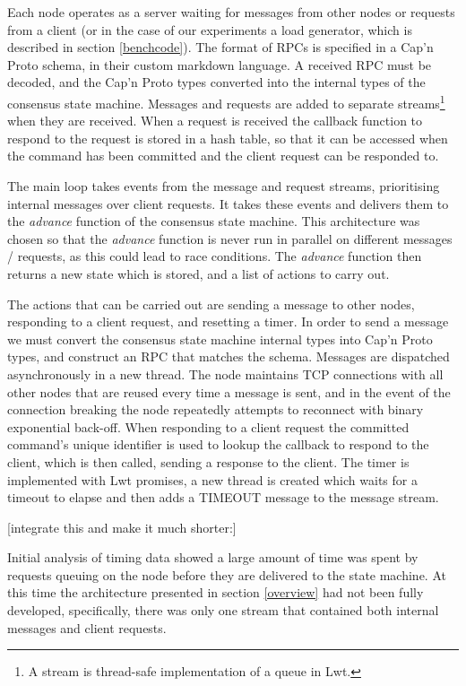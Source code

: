 Each node operates as a server waiting for messages from other nodes or requests from a client (or in the case of our experiments a load generator, which is described in section \ref{benchcode}). The format of RPCs is specified in a Cap'n Proto schema, in their custom markdown language. A received RPC must be decoded, and the Cap'n Proto types converted into the internal types of the consensus state machine. Messages and requests are added to separate streams\footnote{A stream is thread-safe implementation of a queue in Lwt.} when they are received. When a request is received the callback function to respond to the request is stored in a hash table, so that it can be accessed when the command has been committed and the client request can be responded to.

The main loop takes events from the message and request streams, prioritising internal messages over client requests. It takes these events and delivers them to the \textit{advance} function of the consensus state machine. This architecture was chosen so that the \textit{advance} function is never run in parallel on different messages / requests, as this could lead to race conditions. The \textit{advance} function then returns a new state which is stored, and a list of actions to carry out.

The actions that can be carried out are sending a message to other nodes, responding to a client request, and resetting a timer. In order to send a message we must convert the consensus state machine internal types into Cap'n Proto types, and construct an RPC that matches the schema. Messages are dispatched asynchronously in a new thread. The node maintains TCP connections with all other nodes that are reused every time a message is sent, and in the event of the connection breaking the node repeatedly attempts to reconnect with binary exponential back-off. When responding to a client request the committed command's unique identifier is used to lookup the callback to respond to the client, which is then called, sending a response to the client. The timer is implemented with Lwt promises, a new thread is created which waits for a timeout to elapse and then adds a TIMEOUT message to the message stream.

[integrate this and make it much shorter:]

Initial analysis of timing data showed a large amount of time was spent by requests queuing on the node before they are delivered to the state machine. At this time the architecture presented in section \ref{overview} had not been fully developed, specifically, there was only one stream that contained both internal messages and client requests.

